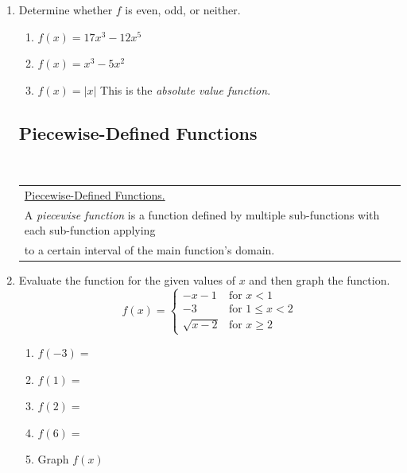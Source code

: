 \begin{enumerate}
\item Determine whether $f$ is even, odd, or neither. 
\begin{enumerate}
\item $f(x)=17x^3-12x^5$\\[1in]
\item $f(x)=x^3-5x^2$\\[1in]
\item $f(x)=|x|$ This is the \emph{absolute value function}. \\[1in]%
\end{enumerate}



\newpage


\subsection{Piecewise-Defined Functions} ~

\hspace{-.4in} \begin{tabular}{| l |} \hline \underline{Piecewise-Defined Functions.}  \\
A \emph{piecewise function} is a function defined by multiple sub-functions with each sub-function applying\\ to a certain interval of the main function's domain.\\
 \hline
\end{tabular}



\item Evaluate the function for the given values of $x$ and then graph the function.
\[
  f(x) =
  \begin{cases}
                                   -x-1 & \text{for $x<1$} \\
                                   -3 & \text{for $1 \leq x <2$} \\
  \sqrt{x-2} & \text{for $x \geq 2$}
  \end{cases}
\]

\begin{enumerate}
\item $f(-3)=$\\[.2in]
\item $f(1)=$ \\[.2in]
\item $f(2)=$ \\[.2in]
\item $f(6)=$ \\[.2in]
\item Graph $f(x)$
\end{enumerate}



\end{enumerate}
